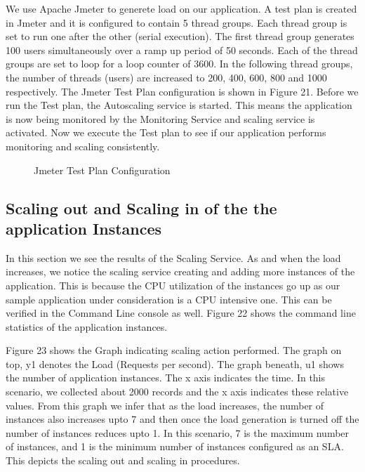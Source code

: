 \documentclass[article,type=msc,colorback,12pt,accentcolor=tud7b,table]{tudthesis}
\begin{document}
 We use Apache Jmeter to generete load on our application. A test plan is created in Jmeter and it is configured to contain 5 thread groups. Each thread group is set to run one after the other (serial execution). The first thread group generates 100 users simultaneously over a ramp up period of 50 seconds. Each of the thread groups are set to loop for a loop counter of 3600. In the following thread groups, the number of threads (users) are increased to 200, 400, 600, 800 and 1000 respectively. The Jmeter Test Plan configuration is shown in Figure 21. Before we run the Test plan, the Autoscaling service is started. This means the application is now being monitored by the Monitoring Service and scaling service is activated. Now we execute the Test plan to see if our application performs monitoring and scaling consistently.
 
  \begin{figure}[h]
  	\begin{center}
  		\makebox[\textwidth]{\texttt{[image: E3]}}
  	\end{center}
  	\caption{Jmeter Test Plan Configuration}
  \end{figure}
	
	\subsection{Scaling out and Scaling in of the the application Instances}
		
	In this section we see the results of the Scaling Service. As and when the load increases, we notice the scaling service creating and adding more instances of the application. This is because the CPU utilization of the instances go up as our sample application under consideration is a CPU intensive one. This can be verified in the Command Line console as well. Figure 22 shows the command line statistics of the application instances.
	
	Figure 23 shows the Graph indicating scaling action performed. The graph on top, y1 denotes the Load (Requests per second). The graph beneath, u1 shows the number of application instances. The x axis indicates the time. In this scenario, we collected about 2000 records and the x axis indicates these relative values. From this graph we infer that as the load increases, the number of instances also increases upto 7 and then once the load generation is turned off the number of instances reduces upto 1. In this scenario, 7 is the maximum number of instances, and 1 is the minimum number of instances configured as an SLA. This depicts the scaling out and scaling in procedures. 
	
\end{document}
